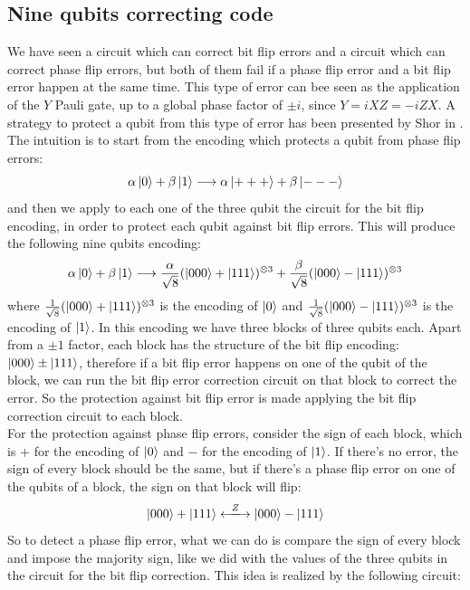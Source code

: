 \documentclass{article}
\begin{document}
	\subsection{Nine qubits correcting code}
	We have seen a circuit which can correct bit flip errors and a circuit which can correct phase flip errors, but both of them fail if a phase flip error and a bit flip error happen at the same time. This type of error can bee seen as the application of the $Y$ Pauli gate, up to a global phase factor of $\pm i$, since $Y = iXZ = -iZX$. A strategy to protect a qubit from this type of error has been presented by Shor in \cite{PhysRevA.52.R2493}. The intuition is to start from the encoding which protects a qubit from phase flip errors:
	\[ \alpha\ket{0} + \beta\ket{1} \longrightarrow \alpha\ket{+++} + \beta\ket{---}\]
	and then we apply to each one of the three qubit the circuit for the bit flip encoding, in order to protect each qubit against bit flip errors. This will produce the following nine qubits encoding:
	\[ \alpha\ket{0} + \beta\ket{1} \longrightarrow \frac{\alpha}{\sqrt{8}}(\ket{000} + \ket{111})^{\otimes 3} + \frac{\beta}{\sqrt{8}} (\ket{000} - \ket{111})^{\otimes 3}\]
	where $\frac{1}{\sqrt{8}}(\ket{000} + \ket{111})^{\otimes 3}$ is the encoding of $\ket{0}$ and $\frac{1}{\sqrt{8}}(\ket{000} - \ket{111})^{\otimes 3}$ is the encoding of $\ket{1}$. In this encoding we have three blocks of three qubits each. Apart from a $\pm1$ factor, each block has the structure of the bit flip encoding: $\ket{000} \pm \ket{111}$, therefore if a bit flip error happens on one of the qubit of the block, we can run the bit flip error correction circuit on that block to correct the error. So the protection against bit flip error is made applying the bit flip correction circuit to each block. \\
	For the protection against phase flip errors, consider the sign of each block, which is $+$ for the encoding of $\ket{0}$ and $-$ for the encoding of $\ket{1}$. If there's no error, the sign of every block should be the same, but if there's a phase flip error on one of the qubits of a block, the sign on that block will flip:
	\[ \ket{000} + \ket{111} \xlongleftrightarrow{Z} \ket{000} - \ket{111} \]
	So to detect a phase flip error, what we can do is compare the sign of every block and impose the majority sign, like we did with the values of the three qubits in the circuit for the bit flip correction. This idea is realized by the following circuit:
\end{document}
